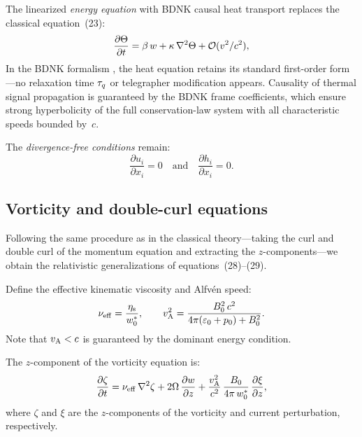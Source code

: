 The linearized \emph{energy equation} with BDNK causal heat
transport replaces the classical equation~(23):
\begin{equation}
  \frac{\partial\Theta}{\partial t}
  = \beta\,w + \kappa\,\nabla^{2}\Theta
  + \mathcal{O}(v^{2}/c^{2}),
  \label{eq:rel51-energy}
\end{equation}
In the BDNK formalism \citep{BemficaDN2018,Kovtun2019}, the heat
equation retains its standard first-order form---no relaxation time
$\tau_{q}$ or telegrapher modification appears.  Causality of thermal
signal propagation is guaranteed by the BDNK frame coefficients,
which ensure strong hyperbolicity of the full conservation-law system
with all characteristic speeds bounded by~$c$.

The \emph{divergence-free conditions} remain:
\begin{equation}
  \frac{\partial u_{i}}{\partial x_{i}} = 0
  \quad\text{and}\quad
  \frac{\partial h_{i}}{\partial x_{i}} = 0.
  \label{eq:rel51-divfree}
\end{equation}

\subsection{Vorticity and double-curl equations}
\label{sec:vort-doublecurl}

Following the same procedure as in the classical theory---taking the
curl and double curl of the momentum equation and extracting the
$z$-components---we obtain the relativistic generalizations of
equations~(28)--(29).

Define the effective kinematic viscosity and Alfv\'en speed:
\begin{equation}
  \nu_{\mathrm{eff}}
  = \frac{\eta_{\mathrm{s}}}{w^{*}_{0}},
  \qquad
  v_{\mathrm{A}}^{2}
  = \frac{B_{0}^{2}\,c^{2}}{4\pi(\varepsilon_{0}+p_{0})+B_{0}^{2}}.
  \label{eq:rel51-nueff-vA}
\end{equation}
Note that $v_{\mathrm{A}} < c$ is guaranteed by the dominant energy condition.

The $z$-component of the vorticity equation is:
\begin{equation}
  \frac{\partial\zeta}{\partial t}
  = \nu_{\mathrm{eff}}\,\nabla^{2}\zeta
  + 2\Omega\,\frac{\partial w}{\partial z}
  + \frac{v_{\mathrm{A}}^{2}}{c^{2}}\,
    \frac{B_{0}}{4\pi\,w^{*}_{0}}\,
    \frac{\partial\xi}{\partial z},
  \label{eq:rel51-zeta}
\end{equation}
where $\zeta$ and $\xi$ are the $z$-components of the vorticity and
current perturbation, respectively.

